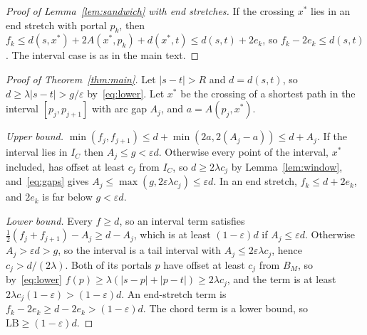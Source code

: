 \documentclass[sigconf,nonacm,screen]{acmart}
\newcommand{\LB}{\mathrm{LB}}
\newcommand{\eps}{\varepsilon}
\begin{document}
\begin{proof}[Proof of Lemma~\ref{lem:sandwich} with end stretches]
If the crossing $x^\ast$ lies in an end stretch with portal $p_k$, then $f_k\le d(s,x^\ast)+2A(x^\ast,p_k)+d(x^\ast,t)
\le d(s,t)+2e_k$, so $f_k-2e_k\le d(s,t)$. The interval case is as in the main text.
\end{proof}

\begin{proof}[Proof of Theorem~\ref{thm:main}]
Let $|s-t|>R$ and $d=d(s,t)$, so $d\ge\lambda|s-t|>g/\eps$ by~\eqref{eq:lower}. Let $x^\ast$ be the crossing of a
shortest path in the interval $[p_j,p_{j+1}]$ with arc gap $A_j$, and $a=A(p_j,x^\ast)$.

\emph{Upper bound.} $\min(f_j,f_{j+1})\le d+\min(2a,2(A_j-a))\le d+A_j$. If the interval lies in $I_C$ then
$A_j\le g<\eps d$. Otherwise every point of the interval, $x^\ast$ included, has offset at least $c_j$ from $I_C$, so
$d\ge 2\lambda c_j$ by Lemma~\ref{lem:window}, and~\eqref{eq:gaps} gives $A_j\le\max(g,2\eps\lambda c_j)\le\eps d$. In
an end stretch, $f_k\le d+2e_k$, and $2e_k$ is far below $g<\eps d$.

\emph{Lower bound.} Every $f\ge d$, so an interval term satisfies $\frac12(f_j+f_{j+1})-A_j\ge d-A_j$, which is at
least $(1-\eps)d$ if $A_j\le\eps d$. Otherwise $A_j>\eps d>g$, so the interval is a tail interval with
$A_j\le 2\eps\lambda c_j$, hence $c_j>d/(2\lambda)$. Both of its portals $p$ have offset at least $c_j$ from $B_M$,
so by~\eqref{eq:lower} $f(p)\ge\lambda(|s-p|+|p-t|)\ge 2\lambda c_j$, and the term is at least
$2\lambda c_j(1-\eps)>(1-\eps)d$. An end-stretch term is $f_k-2e_k\ge d-2e_k>(1-\eps)d$. The chord term is a lower
bound, so $\LB\ge(1-\eps)d$.
\end{proof}
\end{document}
